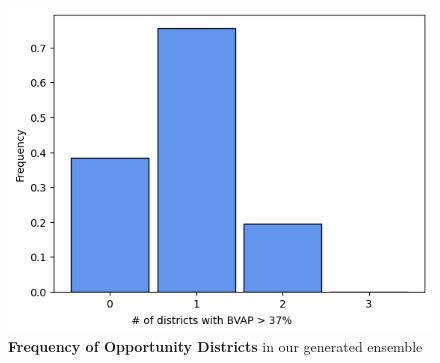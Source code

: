\documentclass{article}
\begin{document}
\begin{figure}[h]\label{fig 12}
    \centering
    \includegraphics*[scale=.6]{images/bvap_freq.png}
    \caption{\textbf{Frequency of Opportunity Districts} in our generated ensemble}
\end{figure}
\end{document}
